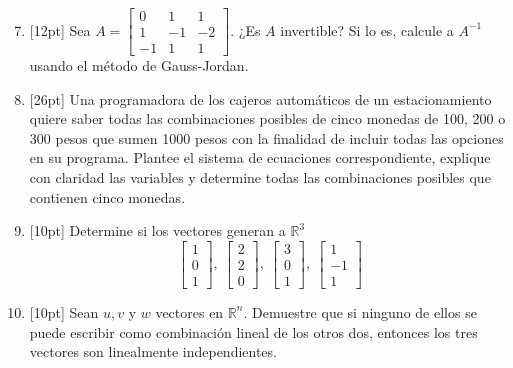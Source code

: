 \documentclass[11pt]{article}
\begin{document}
\begin{enumerate}
\setcounter{enumi}{6}
\item{}[12pt] Sea $A = \begin{bmatrix}0&1&1\\1&-1&-2\\-1&1&1\end{bmatrix}$. ¿Es $A$ invertible? Si lo es, calcule a $A^{-1}$ usando el método de Gauss-Jordan.

\vspace{6cm}

\item{}[26pt] Una programadora de los cajeros automáticos de un estacionamiento quiere saber todas las combinaciones posibles de cinco monedas de 100, 200 o 300 pesos que sumen 1000 pesos con la finalidad de incluir todas las opciones en su programa. Plantee el sistema de ecuaciones correspondiente, explique con claridad las variables y determine todas las combinaciones posibles que contienen cinco monedas.

\vspace{8cm}

\item{}[10pt] Determine si los vectores generan a $\mathbb{R}^3$
\[
\begin{bmatrix}1\\0\\1\end{bmatrix},\ \begin{bmatrix}2\\2\\0\end{bmatrix},\ \begin{bmatrix}3\\0\\1\end{bmatrix},\ \begin{bmatrix}1\\-1\\1\end{bmatrix}
\]

\vspace{8cm}

\item{}[10pt] Sean $u, v$ y $w$ vectores en $\mathbb{R}^n$. Demuestre que si ninguno de ellos se puede escribir como combinación lineal de los otros dos, entonces los tres vectores son linealmente independientes.

\vspace{5cm}
\end{enumerate}

\examfooter
\end{document}
